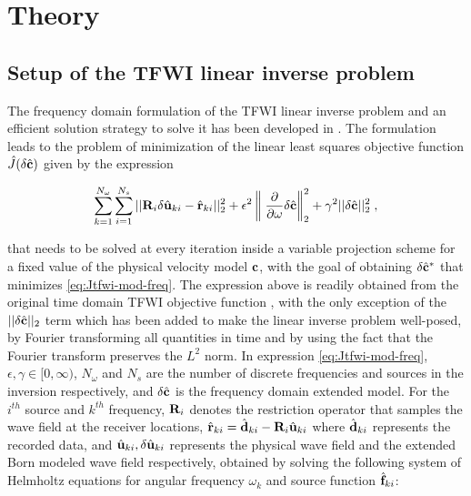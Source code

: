 \section{Theory}

\vspace*{-0.2cm}
\subsection{Setup of the TFWI linear inverse problem}

\vspace*{-0.1cm}
The frequency domain formulation of the TFWI linear inverse problem and an efficient solution strategy to solve it has been developed in \cite{Sarkar.sep.172.rahul1}. The formulation leads to the problem of minimization of the linear least squares objective function $\hat{J}(\delta \hat{\mathbf{c}})$ given by the expression

\vspace*{-0.7cm}
\begin{equation}
\sum_{k=1}^{N_\omega} \sum_{i=1}^{N_s} ||\mathbf{R}_i \delta \hat{\mathbf{u}}_{ki} - \hat{\mathbf{r}}_{ki}||_2^2 + \epsilon^2 \left\lVert\; \frac{\partial}{\partial \omega} \delta \hat{\mathbf{c}} \right\rVert^2_2 + \gamma^2 ||\delta \hat{\mathbf{c}}||^2_2\;,
\label{eq:Jtfwi-mod-freq}
\end{equation}
\vspace*{-0.5cm}

that needs to be solved at every iteration inside a variable projection scheme for a fixed value of the physical velocity model $\mathbf{c}$, with the goal of obtaining $\delta \hat{\mathbf{c}}^{\ast}$ that minimizes \eqref{eq:Jtfwi-mod-freq}. The expression above is readily obtained from the original time domain TFWI objective function \citep{TFWI.gp}, with the only exception of the $||\delta \hat{\mathbf{c}}||_2$ term which has been added to make the linear inverse problem well-posed, by Fourier transforming all quantities in time and by using the fact that the Fourier transform preserves the $L^2$ norm. In expression \eqref{eq:Jtfwi-mod-freq}, $\epsilon, \gamma \in [0, \infty)$, $N_\omega$ and $N_s$ are the number of discrete frequencies and sources in the inversion respectively, and $\delta \hat{\mathbf{c}}$ is the frequency domain extended model. For the $i^{th}$ source and $k^{th}$ frequency, $\mathbf{R}_i$ denotes the restriction operator that samples the wave field at the receiver locations, $\hat{\mathbf{r}}_{ki} = \hat{\mathbf{d}}_{ki} - \mathbf{R}_i \hat{\mathbf{u}}_{ki}$ where $\hat{\mathbf{d}}_{ki}$ represents the recorded data, and $\hat{\mathbf{u}}_{ki}, \delta \hat{\mathbf{u}}_{ki}$ represents the physical wave field and the extended Born modeled wave field respectively, obtained by solving the following system of Helmholtz equations for angular frequency $\omega_k$ and source function $\hat{\mathbf{f}}_{ki}$:


